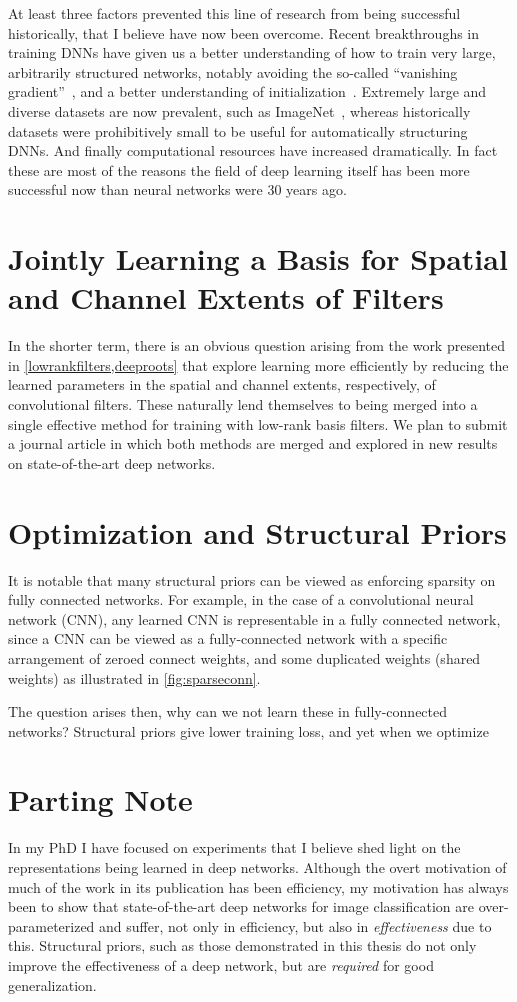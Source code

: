 \documentclass[thesis]{subfiles}
\begin{document}
At least three factors prevented this line of research from being successful historically, that I believe have now been overcome. Recent breakthroughs in training DNNs have given us a better understanding of how to train very large, arbitrarily structured networks, notably avoiding the so-called ``vanishing gradient''~\citep{Ioffe2015,He2016}, and a better understanding of initialization~\citep{He2015b}. Extremely large and diverse datasets are now prevalent, such as ImageNet~\citep{ILSVRC2015}, whereas historically datasets were prohibitively small to be useful for automatically structuring DNNs. And finally computational resources have increased dramatically. In fact these are most of the reasons the field of deep learning itself has been more successful now than neural networks were 30 years ago.

\section{Jointly Learning a Basis for Spatial and Channel Extents of Filters}
\label{journalplan}
In the shorter term, there is an obvious question arising from the work presented in \cref{lowrankfilters,deeproots} that explore learning more efficiently by reducing the learned parameters in the spatial and channel extents, respectively, of convolutional filters. These naturally lend themselves to being merged into a single effective method for training with low-rank basis filters. We plan to submit a journal article in which both methods are merged and explored in new results on state-of-the-art deep networks.

\section{Optimization and Structural Priors}
It is notable that many structural priors can be viewed as enforcing sparsity on fully connected networks. For example, in the case of a convolutional neural network (CNN), any learned CNN is representable in a fully connected network, since a CNN can be viewed as a fully-connected network with a specific arrangement of zeroed connect weights, and some duplicated weights (shared weights) as illustrated in \cref{fig:sparseconn}.

The question arises then, why can we not learn these in fully-connected networks? Structural priors give lower training loss, and yet when we optimize 
\section{Parting Note}
In my PhD I have focused on experiments that I believe shed light on the representations being learned in deep networks. Although the overt motivation of much of the work in its publication has been efficiency, my motivation has always been to show that state-of-the-art deep networks for image classification are over-parameterized and suffer, not only in efficiency, but also in \emph{effectiveness} due to this. Structural priors, such as those demonstrated in this thesis do not only improve the effectiveness of a deep network, but are \emph{required} for good generalization.
\end{document}
